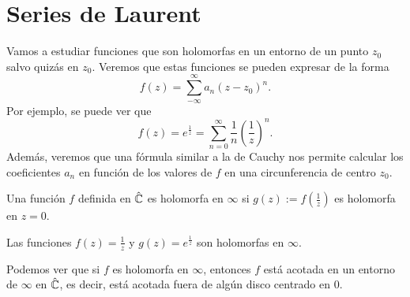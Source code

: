 \section{Series de Laurent}
Vamos a estudiar funciones que son holomorfas en un entorno de un punto $\displaystyle z_{0} $ salvo quizás en $\displaystyle z_{0} $. Veremos que estas funciones se pueden expresar de la forma 
\[f\left(z\right)=\sum^{\infty}_{-\infty }a_{n}\left(z-z_{0}\right)^{n} .\]
Por ejemplo, se puede ver que 
\[f\left(z\right)=e^{\frac{1}{z}} = \sum^{\infty}_{n = 0}\frac{1}{n}\left(\frac{1}{z}\right)^{n} .\]
Además, veremos que una fórmula similar a la de Cauchy nos permite calcular los coeficientes $\displaystyle a_{n} $ en función de los valores de $\displaystyle f $ en una circunferencia de centro $\displaystyle z_{0} $. 

\begin{definition}
Una función $\displaystyle f $ definida en $\displaystyle \hat{\mathbb{C}} $ es holomorfa en $\displaystyle \infty  $ si $\displaystyle g\left(z\right):=f\left(\frac{1}{z}\right) $ es holomorfa en $\displaystyle z = 0 $.
\end{definition}
\begin{eg}
Las funciones $\displaystyle f\left(z\right)=\frac{1}{z} $ y $\displaystyle g\left(z\right)=e^{\frac{1}{z}} $ son holomorfas en $\displaystyle \infty  $. 
\end{eg}
\begin{observation}
Podemos ver que si $\displaystyle f $ es holomorfa en $\displaystyle \infty $, entonces $\displaystyle f $ está acotada en un entorno de $\displaystyle \infty  $ en $\displaystyle \hat{\mathbb{C}} $, es decir, está acotada fuera de algún disco centrado en $\displaystyle 0 $. 
\end{observation}

